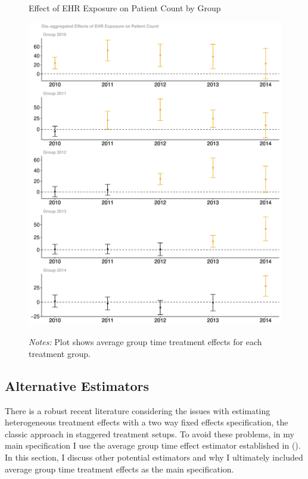 \documentclass[12pt]{article}
\begin{document}
\begin{figure}[ht!]
    \centering
    \captionsetup{width=.6\linewidth}
    \caption{Effect of EHR Exposure on Patient Count by Group}
    \includegraphics[scale=.4]{Objects/patient_group.pdf}
    \label{fig:patientgroup}
    \vspace{2mm}
    \caption*{\footnotesize{\textit{Notes:} Plot shows average group time treatment effects for each treatment group.}}
\end{figure}





\subsection{Alternative Estimators}\label{app:estimators}

There is a robust recent literature considering the issues with estimating heterogeneous treatment effects with a two way fixed effects specification, the classic approach in staggered treatment setups. To avoid these problems, in my main specification I use the average group time effect estimator established in \citeauthor{callaway2021difference} (\citeyear{callaway2021difference}). In this section, I discuss other potential estimators and why I ultimately included average group time treatment effects as the main specification. 
\end{document}
